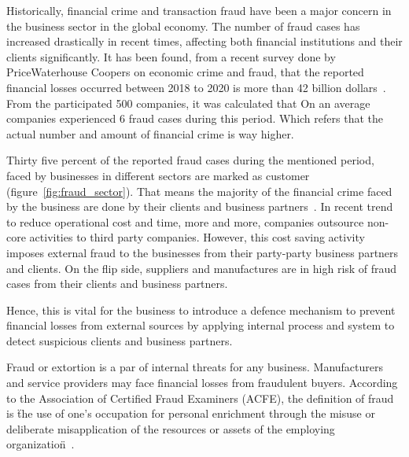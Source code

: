 
Historically, financial crime and transaction fraud have been a major concern in the business sector in the global economy. The number of fraud cases has increased drastically in recent times, affecting both financial institutions and their clients significantly. It has been found, from a recent survey done by PriceWaterhouse Coopers on economic crime and fraud, that the reported financial losses occurred between 2018 to 2020 is more than 42 billion dollars~\cite{PwC.Crime.Survey}. From the participated 500 companies, it was calculated that On an average companies experienced 6 fraud cases during this period. Which refers that the actual number and amount of financial crime is way higher.   


Thirty five percent of the reported fraud cases during the mentioned period, faced by businesses in different sectors are marked as customer (figure~\ref{fig:fraud_sector}). That means the majority of the financial crime faced by the business are done by their clients and business partners~\cite{PwC.Crime.Survey}. In recent trend to reduce operational cost and time, more and more, companies outsource non-core activities to third party companies. However, this cost saving activity imposes external fraud to the businesses from their party-party business partners and clients. On the flip side, suppliers and manufactures are in high risk of fraud cases from their clients and business partners. 


Hence, this is vital for the business to introduce a defence mechanism to prevent financial losses from external sources by applying internal process and system to detect suspicious clients and business partners. 

Fraud or extortion is a par of internal threats for any business. Manufacturers and service providers may face financial losses from fraudulent buyers. According to the Association of Certified Fraud Examiners (ACFE), the definition of fraud is \"the use of one’s occupation for personal enrichment through the misuse or deliberate misapplication of the resources or assets of the employing organization\"~\cite{kassem_2014}.

